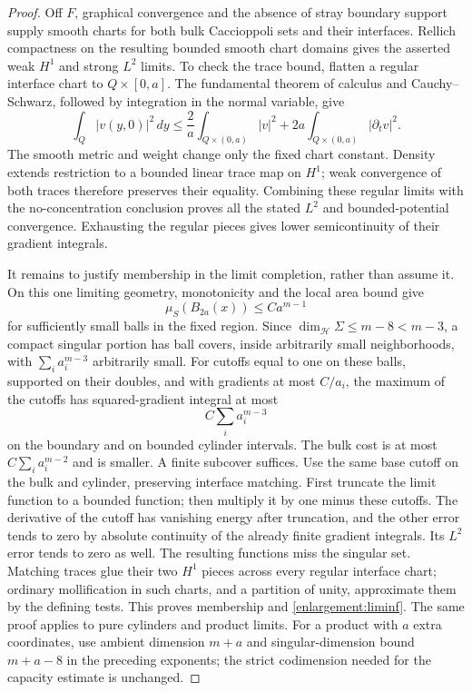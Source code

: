 \begin{proof}
Off $F$, graphical convergence and the absence of stray boundary support
supply smooth charts for both bulk Caccioppoli sets and their interfaces. Rellich
compactness on the resulting bounded smooth chart domains
\citep[Lecture~5, Lemma~4]{simonPDE} gives the asserted weak $H^1$ and
strong $L^2$ limits. To check the trace bound, flatten a regular interface
chart to $Q\times[0,a]$. The fundamental theorem of calculus and
Cauchy--Schwarz, followed by integration in the normal variable, give
\[
 \int_Q |v(y,0)|^2\,dy
 \le \frac{2}{a}\int_{Q\times(0,a)}|v|^2
       +2a\int_{Q\times(0,a)}|\partial_t v|^2.
\]
The smooth metric and weight change only the fixed chart constant.
Density extends restriction to a bounded linear trace map on $H^1$;
weak convergence of both traces therefore preserves their equality.
Combining these regular limits with the no-concentration conclusion
proves all the stated $L^2$ and bounded-potential convergence.  Exhausting
the regular pieces gives lower semicontinuity of their gradient
integrals.

It remains to justify membership in the limit completion, rather than
assume it.  On this one limiting geometry, monotonicity and the local
area bound give
\[
 \mu_S(B_{2a}(x))\le C a^{m-1}
\]
for sufficiently small balls in the fixed region.  Since
$\dim_{\mathcal H}\Sigma\le m-8<m-3$, a compact singular portion has ball
covers, inside arbitrarily small neighborhoods, with
$\sum_i a_i^{m-3}$ arbitrarily small.  For cutoffs equal to one on these
balls, supported on their doubles, and with gradients at most $C/a_i$,
the maximum of the cutoffs has squared-gradient integral at most
\[
 C\sum_i a_i^{m-3}
\]
on the boundary and on bounded cylinder intervals.  The bulk cost is at
most $C\sum_i a_i^{m-2}$ and is smaller.  A finite subcover suffices.
Use the same base cutoff on the bulk and cylinder, preserving interface
matching.  First truncate the limit function to a bounded function;
then multiply it by one minus these cutoffs.  The derivative of the
cutoff has vanishing energy after truncation, and the other error tends
to zero by absolute continuity of the already finite gradient
integrals.  Its $L^2$ error tends to zero as well.  The resulting functions
miss the singular set.  Matching traces glue their two $H^1$ pieces
across every regular interface chart; ordinary mollification in such charts,
and a partition of unity, approximate them by the defining tests.
This proves membership and \cref{enlargement:liminf}.
The same proof applies to pure cylinders and product limits.
For a product with $a$ extra coordinates, use ambient dimension $m+a$
and singular-dimension bound $m+a-8$ in the preceding exponents;
the strict codimension needed for the capacity estimate is unchanged.
\end{proof}


